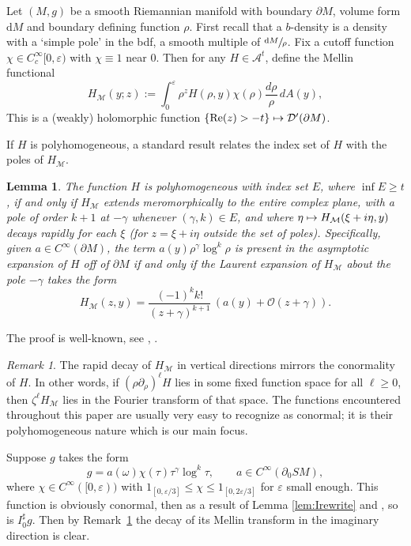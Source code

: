 \documentclass[JEP,XML,SOM,Unicode,NoFloatCountersInSection, NoEqCountersInSection,published]{cedram}
\let\cal\mathcal
\let\epsilon\varepsilon
\def\mto{\mathchoice{\longmapsto}{\mapsto}{\mapsto}{\mapsto}}
\DeclareMathOperator{\Real}{Re}
\theoremstyle{plain}
\newtheorem{Lemma}[Theorem]{Lemma}
\theoremstyle{definition}
\theoremstyle{remark}
\newtheorem{Remark}[Theorem]{Remark}
\def\A{\mathcal{A}}
\def\D{\mathcal{D}}
\newcommand{\adj}{I_0^\sharp}
\newcommand {\dM}{\mathrm{d}M}
\begin{document}
Let $(M,g)$ be a smooth Riemannian manifold with boundary $\partial M$, volume form $\dM$ and boundary defining function $\rho$. First recall that a $b$-density is a density with a `simple pole' in the bdf, \ie a smooth multiple of $\sfrac{\dM}{\rho}$.
Fix a cutoff function $\chi \in C_c^\infty[0,\varepsilon)$ with $\chi\equiv 1$ near $0$. Then for any $H \in \A^t$, define the Mellin functional
\begin{equation*}
H_{\cal M}(y; z) := \int_0^\varepsilon \rho^z H(\rho,y)\chi(\rho) \frac{d\rho}{\rho}\,dA(y),
\end{equation*}
This is a (weakly) holomorphic function $\{\Real(z)>-t\} \mto \D^\prime (\partial M)$.

If $H$ is polyhomogeneous, a standard result relates the index set of $H$ with the poles of $H_{\cal M}$.
\begin{Lemma}\label{lem:Mellin}
The function $H$ is polyhomogeneous with index set $E$, where $\inf E \geq t$, if and only if $H_{\cal M}$ extends meromorphically to the entire complex plane, with a pole of order $k+1$ at $-\gamma$
whenever $(\gamma,k)\in E$, and where $\eta \mto H_{\cal M}(\xi + i\eta, y)$ decays rapidly for each $\xi$ (for $z = \xi + i\eta$ outside the set of poles). Specifically, given $a\in C^\infty(\partial M)$, the term $a(y) \rho^\gamma \log^k \rho$ is present in the asymptotic expansion of $H$ off of $\partial M$ if and only if the Laurent expansion of $H_{\cal M}$ about the pole $-\gamma$ takes the form
\[
H_{\cal M}(z,y) = \frac{(-1)^k k!}{(z+\gamma)^{k+1}}\, (a(y) + {\cal O} (z+\gamma)).
\]
\end{Lemma}

The proof is well-known, see \cite{Melrose1992}, \cite[App.\,A]{Mazzeo1991}.

\begin{Remark}
The rapid decay of $H_{\cal M}$ in vertical directions mirrors the conormality of $H$. In other words, if $(\rho\partial_\rho)^\ell H$ lies in some
fixed function space for all $\ell \geq 0$, then $\zeta^\ell H_{\cal M}$ lies in the Fourier transform of that space. The functions encountered
throughout this paper are usually very easy to recognize as conormal; it is their polyhomogeneous nature which is our main focus.
\label{decay}
\end{Remark}

 \label{sec:proofbackprojection}
Suppose $g$ takes the form
\begin{equation*}
g = a(\omega) \chi(\tau) \tau^\gamma \log^k \tau, \qquad a\in C^\infty(\partial_0 SM),
\end{equation*}
where $\chi\in C^\infty([0,\epsilon))$ with $1_{[0,\epsilon/3]} \le \chi \le 1_{[0,2\epsilon/3]}$ for $\epsilon$ small enough. This function is obviously conormal, then as a result of Lemma \ref{lem:Irewrite} and \cite[Th.\,3 \& 5]{Melrose1992}, so is $\adj g$. Then by Remark~\ref{decay} the decay of its Mellin transform in the imaginary direction is clear.
\end{document}
